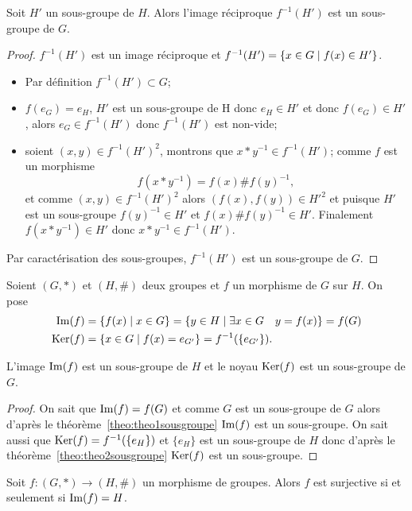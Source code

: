 \begin{theo}\label{theo:theo2sousgroupe}
  Soit $H'$ un sous-groupe de $H$. Alors l'image réciproque $f^{-1}(H')$ est un sous-groupe de $G$.
\end{theo}
\begin{proof}
  $f^{-1}(H')$ est un image réciproque et $f^{-1}(H')=\left\{x \in G\mathrel{}\middle|\mathrel{}f(x) \in H'\right\}$.
  \begin{itemize}
  \item Par définition $f^{-1}(H') \subset G$;
  \item $f(e_G)=e_H$, $H'$ est un sous-groupe de H donc $e_H \in H'$ et donc $f(e_G) \in H'$, alors $e_G \in f^{-1}(H')$ donc $f^{-1}(H')$ est non-vide;
  \item soient $(x,y) \in f^{-1}(H')^2$, montrons que $x*y^{-1} \in f^{-1}(H')$; comme $f$ est un morphisme
    \begin{equation}
      f(x*y^{-1}) = f(x) \# f(y)^{-1},
    \end{equation}
    et comme $(x,y) \in f^{-1}(H')^2$ alors $(f(x), f(y)) \in H'^2$ et puisque $H'$ est un sous-groupe $f(y)^{-1} \in H'$ et $f(x) \# f(y)^{-1} \in H'$. Finalement $f(x*y^{-1}) \in H'$ donc $x*y^{-1} \in f^{-1}(H')$.
  \end{itemize}
  Par caractérisation des sous-groupes, $f^{-1}(H')$ est un sous-groupe de $G$.
\end{proof}
\begin{defdef}
  Soient $(G,*)$ et $(H,\#)$ deux groupes et $f$ un morphisme de $G$ sur $H$. On pose
  \begin{align}
    \operatorname{Im}(f) &= \left\{f(x)\mathrel{}\middle|\mathrel{}x \in G\right\} = \left\{y \in H\mathrel{}\middle|\mathrel{}\exists x \in G \quad  y=f(x)\right\}=f(G)\\
    \operatorname{Ker}(f) &= \left\{x \in G\mathrel{}\middle|\mathrel{}f(x)=e_{G'}\right\}=f^{-1}(\{e_{G'}\}).
  \end{align}
\end{defdef}
\begin{prop}
  L'image $\operatorname{Im}(f)$ est un sous-groupe de $H$ et le noyau $\operatorname{Ker}(f)$ est un sous-groupe de $G$.
\end{prop}
\begin{proof}
On sait que $\operatorname{Im}(f)=f(G)$ et comme $G$ est un sous-groupe de $G$ alors d'après le théorème~\ref{theo:theo1sousgroupe} $\operatorname{Im}(f)$ est un sous-groupe. On sait aussi que $\operatorname{Ker}(f)=f^{-1}(\{e_H\})$ et $\{e_H\}$ est un sous-groupe de $H$ donc d'après le théorème~\ref{theo:theo2sousgroupe} $\operatorname{Ker}(f)$ est un sous-groupe.
\end{proof}
\begin{prop}
  Soit $f:(G,*) \longrightarrow (H,\#)$ un morphisme de groupes. Alors $f$ est surjective si et seulement si $\operatorname{Im}(f)=H$.
\end{prop}

